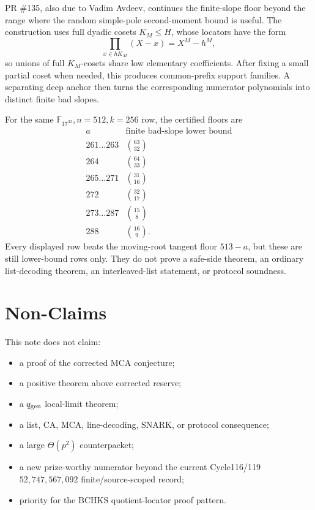 \documentclass[11pt]{article}
\newcommand{\F}{\mathbb F}
\newcommand{\qgen}{q_{\rm gen}}
\begin{document}
PR \#135, also due to Vadim Avdeev, continues the finite-slope floor beyond the
range where the random simple-pole second-moment bound is useful.  The
construction uses full dyadic cosets \(K_M\le H\), whose locators have the form
\[
  \prod_{x\in hK_M}(X-x)=X^M-h^M,
\]
so unions of full \(K_M\)-cosets share low elementary coefficients.  After
fixing a small partial coset when needed, this produces common-prefix support
families.  A separating deep anchor then turns the corresponding numerator
polynomials into distinct finite bad slopes.

For the same \(\F_{17^{32}},n=512,k=256\) row, the certified floors are
\[
\begin{array}{c|c}
a & \text{finite bad-slope lower bound}\\
\hline
261\ldots263 & \binom{63}{32}\\
264 & \binom{64}{33}\\
265\ldots271 & \binom{31}{16}\\
272 & \binom{32}{17}\\
273\ldots287 & \binom{15}{8}\\
288 & \binom{16}{9}.
\end{array}
\]
Every displayed row beats the moving-root tangent floor \(513-a\), but these
are still lower-bound rows only.  They do not prove a safe-side theorem, an
ordinary list-decoding theorem, an interleaved-list statement, or protocol
soundness.

\section{Non-Claims}
\label{sec:nonclaims}

This note does not claim:
\begin{itemize}
\item a proof of the corrected MCA conjecture;
\item a positive theorem above corrected reserve;
\item a \(\qgen\) local-limit theorem;
\item a list, CA, MCA, line-decoding, SNARK, or protocol consequence;
\item a large \(\Theta(p^2)\) counterpacket;
\item a new prize-worthy numerator beyond the current Cycle116/119
  \(52{,}747{,}567{,}092\) finite/source-scoped record;
\item priority for the BCHKS quotient-locator proof pattern.
\end{itemize}
\end{document}
